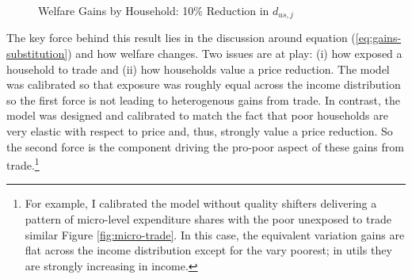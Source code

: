 \documentclass[12pt,pdftex]{article}
\begin{document}
\begin{onehalfspacing}
\begin{figure}[!t]
\caption{Welfare Gains by Household: 10\% Reduction in $d_{us,j}$}\label{fig:welfare-households}
\end{figure}

The key force behind this result lies in the discussion around equation (\ref{eq:gains-substitution}) and how welfare changes. Two issues are at play: (i) how exposed a household to trade and (ii) how households value a price reduction. The model was calibrated so that exposure was roughly equal across the income distribution so the first force is not leading to heterogenous gains from trade. In contrast, the model was designed and calibrated to match the fact that poor households are very elastic with respect to price and, thus, strongly value a price reduction. So the second force is the component driving the pro-poor aspect of these gains from trade.\footnote{For example, I calibrated the model without quality shifters delivering a pattern of micro-level expenditure shares with the poor unexposed to trade similar Figure \ref{fig:micro-trade}. In this case, the equivalent variation gains are flat across the income distribution except for the vary poorest; in utils they are strongly increasing in income.}


\end{onehalfspacing}
\end{document}
